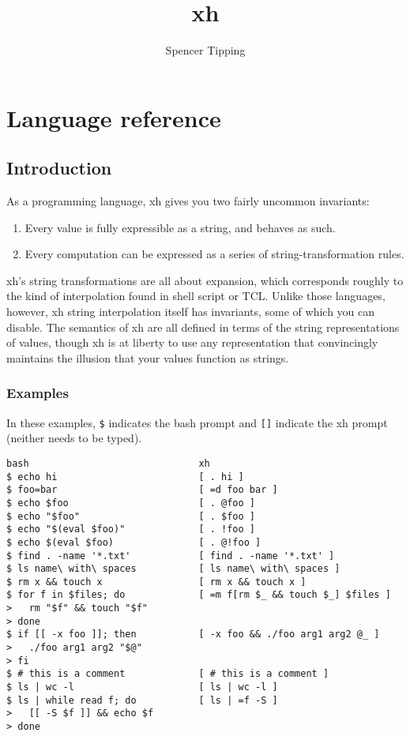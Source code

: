 \documentclass{report}
\title{xh}
\author{Spencer Tipping}
\begin{document}
\maketitle{}
\tableofcontents{}


\part{Language reference}\label{part:language-reference}
\chapter{Introduction}\label{chp:introduction}
  As a programming language, xh gives you two fairly uncommon invariants:

\begin{enumerate}
\item{Every value is fully expressible as a string, and behaves as such.}
       \label{item:values-are-strings}
\item{Every computation can be expressed as a series of}
       string-transformation rules.
       \label{item:computation-is-transformation}
\end{enumerate}

  xh's string transformations are all about expansion, which corresponds
  roughly to the kind of interpolation found in shell script or TCL. Unlike
  those languages, however, xh string interpolation itself has invariants, some
  of which you can disable. The semantics of xh are all defined in terms of the
  string representations of values, though xh is at liberty to use any
  representation that convincingly maintains the illusion that your values
  function as strings.

\section{Examples}\label{sec:examples}
    In these examples, \verb|$| indicates the bash prompt and \verb|[]|
    indicate the xh prompt (neither needs to be typed).

\begin{verbatim}
bash                              xh
$ echo hi                         [ . hi ]
$ foo=bar                         [ =d foo bar ]
$ echo $foo                       [ . @foo ]
$ echo "$foo"                     [ . $foo ]
$ echo "$(eval $foo)"             [ . !foo ]
$ echo $(eval $foo)               [ . @!foo ]
$ find . -name '*.txt'            [ find . -name '*.txt' ]
$ ls name\ with\ spaces           [ ls name\ with\ spaces ]
$ rm x && touch x                 [ rm x && touch x ]
$ for f in $files; do             [ =m f[rm $_ && touch $_] $files ]
>   rm "$f" && touch "$f"
> done
$ if [[ -x foo ]]; then           [ -x foo && ./foo arg1 arg2 @_ ]
>   ./foo arg1 arg2 "$@"
> fi
$ # this is a comment             [ # this is a comment ]
$ ls | wc -l                      [ ls | wc -l ]
$ ls | while read f; do           [ ls | =f -S ]
>   [[ -S $f ]] && echo $f
> done
\end{verbatim}
\end{document}
